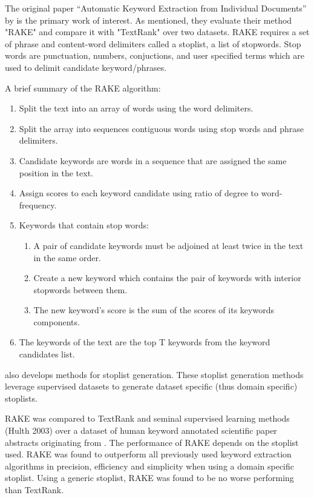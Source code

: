 \documentclass[11pt,a4paper]{article}
\begin{document}
The original paper “Automatic Keyword Extraction from Individual Documents” by \citet{1} is the primary work of interest. As mentioned, they evaluate their method "RAKE" and compare it with "TextRank" over two datasets. RAKE requires a set of phrase and content-word delimiters called a stoplist, a list of stopwords. Stop words are punctuation, numbers, conjuctions, and user specified terms which are used to delimit candidate keyword/phrases. 

A brief summary of the RAKE algorithm:
\begin{enumerate}
\item Split the text into an array of words using the word delimiters.
\item Split the array into sequences contiguous words using stop words and phrase delimiters.
\item Candidate keywords are words in a sequence that are assigned the same position in the text. 
\item Assign scores to each keyword candidate using ratio of degree to word-frequency. 
\item Keywords that contain stop words:
\begin{enumerate}
\item A pair of candidate keywords must be adjoined at least twice in the text in the same order.
\item Create a new keyword which contains the pair of keywords with interior stopwords between them.
\item The new keyword’s score is the sum of the scores of its keywords components.
\end{enumerate}
\item The keywords of the text are the top T keywords from the keyword candidates list.
\end{enumerate}

\citet{1} also develops methods for stoplist generation. These stoplist generation methods leverage supervised datasets to generate dataset specific (thus domain specific) stoplists. 

RAKE was compared to TextRank and seminal supervised learning methods (Hulth 2003) over a dataset of human keyword annotated scientific paper abstracts originating from \citet{hulth-2003-improved}. The performance of RAKE depends on the stoplist used. RAKE was found to outperform all previously used keyword extraction algorithms in precision, efficiency and simplicity when using a domain specific stoplist. Using a generic stoplist, RAKE was found to be no worse performing than TextRank.
\end{document}
